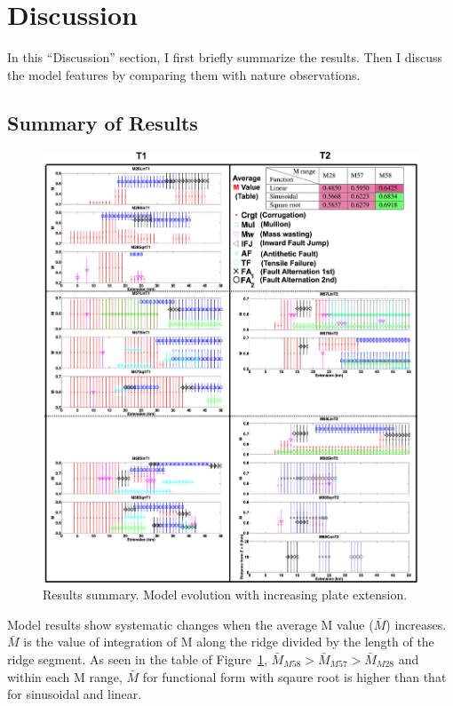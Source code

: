 \pagebreak
\section{Discussion}
In this ``Discussion'' section, I first briefly summarize the results. Then I discuss the model features by comparing them with nature observations.

\subsection{Summary of Results}
\begin{figure}[H]
  \centering
    \includegraphics[width=1.05\textwidth]{./Figures/fig_Discussion_Result_Summary_1_Combine_together.eps}
  \caption{Results summary. Model evolution with increasing plate extension.}
 \label{fig_Discussion_Result_Summary_1_Combine_together}
\end{figure}   

Model results show systematic changes when the average M value ($\bar{M}$) increases. $\bar{M}$ is the value of integration of M along the ridge divided by the length of the ridge segment. As seen in the table of Figure~\hyperref[fig_Discussion_Result_Summary_1_Combine_together]{\ref{fig_Discussion_Result_Summary_1_Combine_together}}, $\bar{M}_{M58} > \bar{M}_{M57} > \bar{M}_{M28}$ and within each M range, $\bar{M}$ for functional form with sqaure root is higher than that for sinusoidal and linear. 

